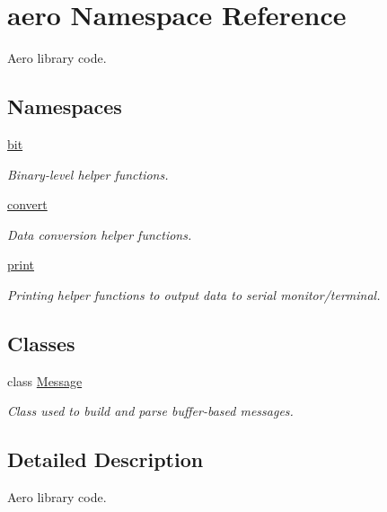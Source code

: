 \hypertarget{namespaceaero}{}\section{aero Namespace Reference}
\label{namespaceaero}


Aero library code.  


\subsection*{Namespaces}
\begin{DoxyCompactItemize}
\item 
 \hyperlink{namespaceaero_1_1bit}{bit}
\begin{DoxyCompactList}\small\item\em Binary-\/level helper functions. \end{DoxyCompactList}\item 
 \hyperlink{namespaceaero_1_1convert}{convert}
\begin{DoxyCompactList}\small\item\em Data conversion helper functions. \end{DoxyCompactList}\item 
 \hyperlink{namespaceaero_1_1print}{print}
\begin{DoxyCompactList}\small\item\em Printing helper functions to output data to serial monitor/terminal. \end{DoxyCompactList}\end{DoxyCompactItemize}
\subsection*{Classes}
\begin{DoxyCompactItemize}
\item 
class \hyperlink{classaero_1_1Message}{Message}
\begin{DoxyCompactList}\small\item\em Class used to build and parse buffer-\/based messages. \end{DoxyCompactList}\end{DoxyCompactItemize}


\subsection{Detailed Description}
Aero library code. 